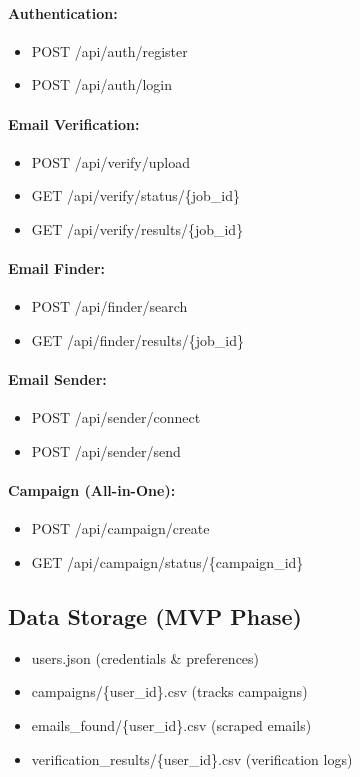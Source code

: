 \documentclass{article}
\begin{document}
\paragraph{Authentication:}
\begin{itemize}
    \item POST /api/auth/register
    \item POST /api/auth/login
\end{itemize}

\paragraph{Email Verification:}
\begin{itemize}
    \item POST /api/verify/upload
    \item GET /api/verify/status/\{job\_id\}
    \item GET /api/verify/results/\{job\_id\}
\end{itemize}

\paragraph{Email Finder:}
\begin{itemize}
    \item POST /api/finder/search
    \item GET /api/finder/results/\{job\_id\}
\end{itemize}

\paragraph{Email Sender:}
\begin{itemize}
    \item POST /api/sender/connect
    \item POST /api/sender/send
\end{itemize}

\paragraph{Campaign (All-in-One):}
\begin{itemize}
    \item POST /api/campaign/create
    \item GET /api/campaign/status/\{campaign\_id\}
\end{itemize}

\subsection{Data Storage (MVP Phase)}
\begin{itemize}
    \item users.json (credentials \& preferences)
    \item campaigns/\{user\_id\}.csv (tracks campaigns)
    \item emails\_found/\{user\_id\}.csv (scraped emails)
    \item verification\_results/\{user\_id\}.csv (verification logs)
\end{itemize}
\end{document}
